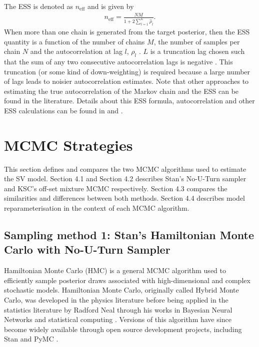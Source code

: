 \documentclass[12pt, a4paper]{article}
\begin{document}
            The ESS is denoted as $n_{\text{eff}}$ and is given by
            \begin{align}
                n_{\text{eff}} = \frac{NM}{1+2 \sum_{l=1}^L \hat{\rho}_l}.
            \end{align}
            When more than one chain is generated from the target posterior, then the ESS quantity is a function of the number of chains $M$, the number of samples per chain $N$ and the autocorrelation at lag $l$, $\rho_l$ \citep{vehtari2021rank}. $L$ is a truncation lag chosen such that the sum of any two consecutive autocorrelation lags is negative \citep{geyer1992practical}. This truncation (or some kind of down-weighting) is required because a large number of lags leads to noisier autocorrelation estimates. Note that other approaches to estimating the true autocorrelation of the Markov chain and the ESS can be found in the literature. Details about this ESS formula, autocorrelation and other ESS calculations can be found in \citet{vehtari2021rank} and \citet{geyer1992practical}.

\section{MCMC Strategies}
This section defines and compares the two MCMC algorithms used to estimate the SV model. Section 4.1 and Section 4.2 describes Stan's No-U-Turn sampler and KSC's off-set mixture MCMC respectively. Section 4.3 compares the similarities and differences between both methods. Section 4.4 describes model reparameterisation in the context of each MCMC algorithm. 
    \subsection{Sampling method 1: Stan's Hamiltonian Monte Carlo with No-U-Turn Sampler}
        Hamiltonian Monte Carlo (HMC) is a general MCMC algorithm used to efficiently sample posterior draws associated with high-dimensional and complex stochastic models. Hamiltonian Monte Carlo, originally called Hybrid Monte Carlo, was developed in the physics literature \citep{duane1987hybrid} before being applied in the statistics literature by Radford Neal through his works in Bayesian Neural Networks \citep{neal1995bayesian} and statistical computing \citep{neal2011mcmc}. Versions of this algorithm have since become widely available through open source development projects, including Stan \citep{stan} and PyMC \citep{pymc2023}.
\end{document}
